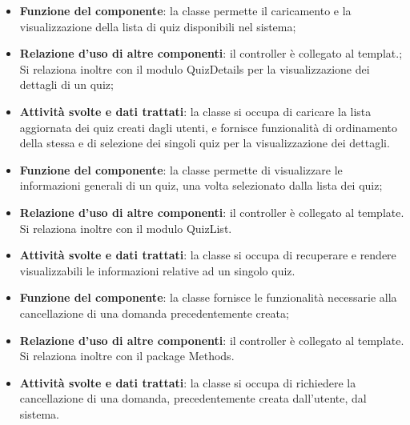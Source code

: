 
\begin{itemize}
	\item\textbf{Funzione del componente}:  la classe permette il caricamento e la visualizzazione della lista di quiz disponibili nel sistema;
	\item\textbf{Relazione d'uso di altre componenti}: il controller è collegato al templat.; Si relaziona inoltre con il modulo QuizDetails per la visualizzazione dei dettagli di un quiz;
	\item\textbf{Attività svolte e dati trattati}: la classe si occupa di caricare la lista aggiornata dei quiz creati dagli utenti, e fornisce funzionalità di ordinamento della stessa e di selezione dei singoli quiz per la visualizzazione dei dettagli. 
\end{itemize}


\begin{itemize}
	\item\textbf{Funzione del componente}: la classe permette di visualizzare le informazioni generali di un quiz, una volta selezionato dalla lista dei quiz;
	\item\textbf{Relazione d'uso di altre componenti}: il controller è collegato al template. Si relaziona inoltre con il modulo QuizList.
	\item\textbf{Attività svolte e dati trattati}: la classe si occupa di recuperare e rendere visualizzabili le informazioni relative ad un singolo quiz.
\end{itemize}


\begin{itemize}
	\item\textbf{Funzione del componente}: la classe fornisce le funzionalità necessarie alla cancellazione di una domanda precedentemente creata;
	\item\textbf{Relazione d'uso di altre componenti}: il controller è collegato al template. Si relaziona inoltre con il package Methods.
	\item\textbf{Attività svolte e dati trattati}: la classe si occupa di richiedere la cancellazione di una domanda, precedentemente creata dall'utente, dal sistema.
\end{itemize}


